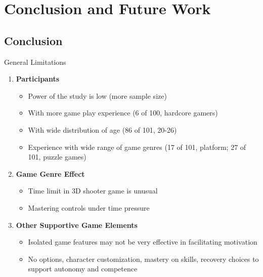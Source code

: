 \documentclass{beamer}
\begin{document}
\section{Conclusion and Future Work}

\subsection{Conclusion}
\begin{frame}{General Limitations}

  \begin{enumerate}
  \item \textbf{Participants}
  	\begin{itemize}
  		\item Power of the study is low (\alert{more sample size})
  		\item With \alert{more game play experience} (6 of 100, hardcore gamers)
  		\item With \alert{wide distribution of age} (86 of 101, 20-26)
  		\item \alert{Experience with wide range of game genres} (17 of 101, platform; 27 of 101, puzzle games)
  	\end{itemize}
  \item \textbf{Game Genre Effect}
  	\begin{itemize}
  		\item Time limit in 3D shooter game is unusual
  		\item Mastering controls under time pressure
  	\end{itemize}
  \item \textbf{Other Supportive Game Elements}
  	\begin{itemize}
  		\item Isolated game features may not be very effective in facilitating motivation \cite{McNamara2010PointsFeedback}
  		\item No options, character customization, mastery on skills, recovery choices to support autonomy and competence
  	\end{itemize}
  \end{enumerate}
\end{frame}
\end{document}
